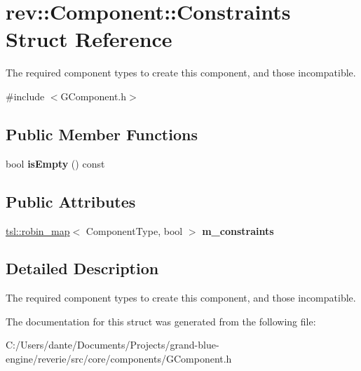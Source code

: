 \hypertarget{structrev_1_1_component_1_1_constraints}{}\section{rev\+::Component\+::Constraints Struct Reference}
\label{structrev_1_1_component_1_1_constraints}


The required component types to create this component, and those incompatible.  




{\ttfamily \#include $<$G\+Component.\+h$>$}

\subsection*{Public Member Functions}
\begin{DoxyCompactItemize}
\item 
\mbox{\label{structrev_1_1_component_1_1_constraints_a770b313eac96ea03d3166ffbf00b8303}} 
bool {\bfseries is\+Empty} () const
\end{DoxyCompactItemize}
\subsection*{Public Attributes}
\begin{DoxyCompactItemize}
\item 
\mbox{\label{structrev_1_1_component_1_1_constraints_a314dd484f1341a9607e1a4c845b2efce}} 
\mbox{\hyperlink{classtsl_1_1robin__map}{tsl\+::robin\+\_\+map}}$<$ Component\+Type, bool $>$ {\bfseries m\+\_\+constraints}
\end{DoxyCompactItemize}


\subsection{Detailed Description}
The required component types to create this component, and those incompatible. 

The documentation for this struct was generated from the following file\+:\begin{DoxyCompactItemize}
\item 
C\+:/\+Users/dante/\+Documents/\+Projects/grand-\/blue-\/engine/reverie/src/core/components/G\+Component.\+h\end{DoxyCompactItemize}
